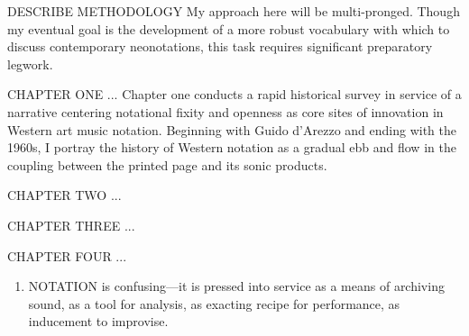DESCRIBE METHODOLOGY
My approach here will be multi-pronged. Though my eventual goal is the development of a more robust vocabulary with which to discuss contemporary neonotations, this task requires significant preparatory legwork.

CHAPTER ONE ...
Chapter one conducts a rapid historical survey in service of a narrative centering notational fixity and openness as core sites of innovation in Western art music notation. 
Beginning with Guido d'Arezzo and ending with the 1960s, I portray the history of Western notation as a gradual ebb and flow in the coupling between the printed page and its sonic products. 

CHAPTER TWO ...

CHAPTER THREE ...

CHAPTER FOUR ...

\begin{enumerate}
    \item NOTATION is confusing---it is pressed into service as a means of archiving sound, as a tool for analysis, as exacting recipe for performance, as inducement to improvise.   
\end{enumerate}
